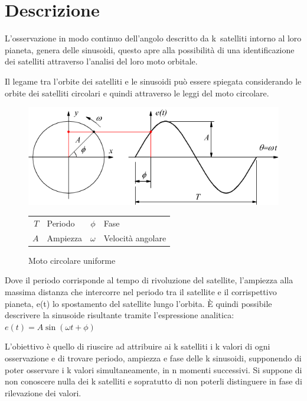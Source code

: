 \documentclass[a4paper,12pt]{report}
\begin{document}
\section{Descrizione}
L'osservazione in modo continuo dell'angolo descritto da  k~satelliti intorno al loro pianeta, genera delle sinusoidi, questo apre alla possibilità di una identificazione dei satelliti attraverso l'analisi del loro moto orbitale.

Il legame tra l'orbite dei satelliti e le sinusoidi può essere spiegata considerando le orbite dei satelliti circolari e quindi attraverso le leggi del moto circolare.
\begin{figure}[H]
  \caption{Moto circolare uniforme}
  \begin{center}
  \includegraphics[scale=0.50]{img/sinusoide_cerchio.png}
  \begin{tabular}{r@{: }l r@{: }l}
  $T$ & Periodo & $\phi$ & Fase \\
  $A$ & Ampiezza & $\omega$ & Velocità angolare
  \end{tabular}
  \end{center}
\end{figure}


Dove il periodo corrisponde al tempo di rivoluzione del satellite, l'ampiezza alla massima distanza che intercorre nel periodo tra il satellite e il corrispettivo pianeta, e(t) lo spostamento del satellite lungo l'orbita. È quindi possibile descrivere la sinusoide risultante tramite l'espressione analitica:
$ e(t) = A\sin(\omega t + \phi)$



L'obiettivo è quello di riuscire ad attribuire ai k satelliti i k valori di
ogni osservazione e di trovare periodo, ampiezza e fase delle k sinusoidi,
supponendo di poter osservare i k valori simultaneamente, in n momenti
successivi. Si suppone di non conoscere nulla dei k satelliti e sopratutto di non poterli distinguere in fase di rilevazione dei valori.
\end{document}
